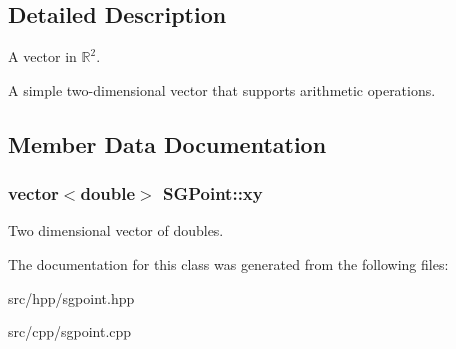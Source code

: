 \subsection{Detailed Description}
A vector in $\mathbb{R}^2$. 

A simple two-\/dimensional vector that supports arithmetic operations. 

\subsection{Member Data Documentation}
\hypertarget{classSGPoint_a3ad7a78283a2797a567575a2a5c3200e}{
\subsubsection[{xy}]{\setlength{\rightskip}{0pt plus 5cm}vector$<$double$>$ S\-G\-Point\-::xy\hspace{0.3cm}{\ttfamily [protected]}}}\label{classSGPoint_a3ad7a78283a2797a567575a2a5c3200e}
Two dimensional vector of doubles. 

The documentation for this class was generated from the following files\-:\begin{DoxyCompactItemize}
\item 
src/hpp/sgpoint.\-hpp\item 
src/cpp/sgpoint.\-cpp\end{DoxyCompactItemize}
